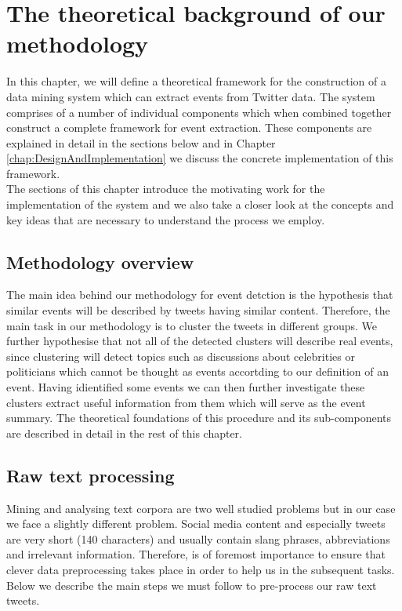 \chapter{The theoretical background of our methodology}\label{TheoreticalFramework}
\ifpdf
    \graphicspath{{Chapter2/Chapter2Figs/PNG/}{Chapter2/Chapter2Figs/PDF/}{Chapter2/Chapter2Figs/}}
\else
    \graphicspath{{Chapter2/Chapter2Figs/EPS/}{Chapter2/Chapter2Figs/}}
\fi

In this chapter, we will define a theoretical framework for the construction of a 
data mining system which can extract events from Twitter data. The system comprises of a number
of individual components which when combined together construct a complete framework for 
event extraction. These components are explained in detail in the sections below and in 
Chapter \ref{chap:DesignAndImplementation} we discuss the concrete implementation of this framework.\\
The sections of this chapter introduce the motivating work for the implementation of the system
and we also take a closer look at the concepts and key ideas that are necessary to understand the process we employ.

\section{Methodology overview}\label{MethodologyOverview}
The main idea behind our methodology for event detction is the hypothesis that similar events will be described by tweets having similar
content. Therefore, the main task in our methodology is to cluster the tweets in different groups. We further hypothesise that not all of the detected
clusters will describe real events, since clustering will detect topics such as discussions about celebrities or politicians which cannot be thought as events
accortding to our definition of an event. Having idientified some events we can then further investigate these clusters extract useful information from them which 
will serve as the event summary. The theoretical foundations of this procedure and its sub-components are described in detail in the rest of this chapter.  

\section{Raw text processing}\label{RawDataProcessing}
Mining and analysing text corpora are two well studied problems but in our case we face a slightly
different problem. Social media content and especially tweets are very short (140 characters)
and usually contain slang phrases, abbreviations and irrelevant information. Therefore, is of
foremost importance to ensure that clever data preprocessing takes place in order to help us in
the subsequent tasks. Below we describe the main steps we must follow to pre-process our raw text tweets. 

